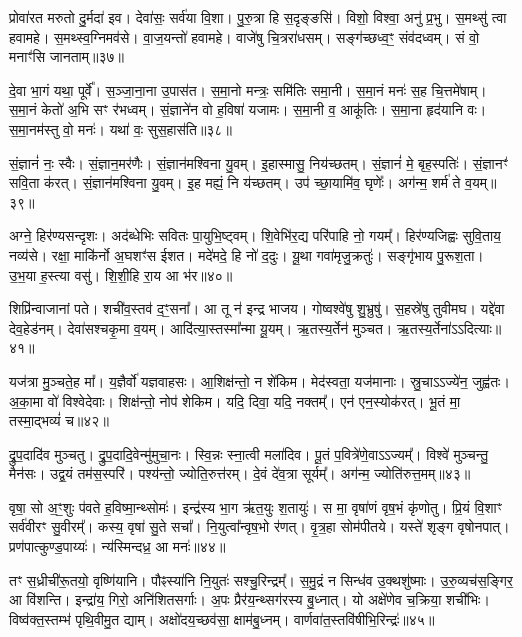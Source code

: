 प्रोवा॑रत मरुतो दु॒र्मदा॑ इव।
देवा॑सः॒ सर्व॑या वि॒शा।
पु॒रु॒त्रा हि स॒दृङ्ङसि॑।
विशो॒ विश्वा॒ अनु॑ प्र॒भु।
स॒मथ्सु॑ त्वा हवामहे।
स॒मथ्स्व॒ग्निमव॑से।
वा॒ज॒यन्तो॑ हवामहे।
वाजे॑षु चि॒त्ररा॑धसम्।
सङ्ग॑च्छध्व॒ꣳ॒ संव॑दध्वम्।
सं वो॒ मनाꣳ॑सि जानताम्॥३७॥\ip

दे॒वा भा॒गं यथा॒ पूर्वे᳚।
स॒ञ्जा॒ना॒ना उ॒पास॑त।
स॒मा॒नो मन्त्रः॒ समि॑तिः समा॒नी।
स॒मा॒नं मनः॑ स॒ह चि॒त्तमे॑षाम्।
स॒मा॒नं केतो॑ अ॒भि सꣳ र॑भध्वम्।
सं॒ज्ञाने॑न वो ह॒विषा॑ यजामः।
स॒मा॒नी व॒ आकू॑तिः।
स॒मा॒ना हृद॑यानि वः।
स॒मा॒नम॑स्तु वो॒ मनः॑।
यथा॑ वः॒ सुस॒हास॑ति॥३८॥\ip

सं॒ज्ञानं॑ नः॒ स्वैः।
सं॒ज्ञान॒मर॑णैः।
सं॒ज्ञान॑मश्विना यु॒वम्।
इ॒हास्मासु॒ निय॑च्छतम्।
सं॒ज्ञानं॑ मे॒ बृह॒स्पतिः॑।
सं॒ज्ञानꣳ॑ सवि॒ता क॑रत्।
सं॒ज्ञान॑मश्विना यु॒वम्।
इ॒ह मह्यं॒ नि य॑च्छतम्।
उप॑ च्छा॒यामि॑व॒ घृणेः᳚।
अग॑न्म॒ शर्म॑ ते व॒यम्॥३९॥\ip

अग्ने॒ हिर॑ण्यसन्दृशः।
अद॑ब्धेभिः सवितः पा॒युभि॒ष्ट्वम्।
शि॒वेभि॑र॒द्य परि॑पाहि नो॒ गयम्᳚।
हिर॑ण्यजिह्वः सुवि॒ताय॒ नव्य॑से।
रक्षा॒ माकि॑र्नो अ॒घशꣳ॑स ईशत।
मदे॑मदे॒ हि नो॑ द॒दुः।
यू॒था गवा॑मृजु॒क्रतुः॑।
सङ्गृ॑भाय पु॒रूश॒ता।
उ॒भ॒या ह॒स्त्या वसु॑।
शि॒शी॒हि रा॒य आ भ॑र॥४०॥\ip

शिप्रि॑न्वाजानां पते।
शची॑व॒स्तव॑ द॒ꣳ॒सना᳚।
आ तू न॑ इन्द्र भाजय।
गोष्वश्वे॑षु शु॒भ्रुषु॑।
स॒हस्रे॑षु तुवीमघ।
यद्दे॑वा देव॒हेड॑नम्।
देवा॑सश्चकृ॒मा व॒यम्।
आदि॑त्या॒स्तस्मा᳚न्मा यू॒यम्।
ऋ॒तस्य॒र्तेन॑ मुञ्चत।
ऋ॒तस्य॒र्तेना॑ऽऽदित्याः॥४१॥\ip

यज॑त्रा मु॒ञ्चते॒ह मा᳚।
य॒ज्ञैर्वो॑ यज्ञवाहसः।
आ॒शिक्ष॑न्तो॒ न शे॑किम।
मेद॑स्वता॒ यज॑मानाः।
स्रु॒चा\-ऽऽज्ये॑न॒ जुह्व॑तः।
अ॒का॒मा वो॑ विश्वेदेवाः।
शिक्ष॑न्तो॒ नोप॑ शेकिम।
यदि॒ दिवा॒ यदि॒ नक्तम्᳚।
एन॑ एन॒स्योक॑रत्।
भू॒तं मा॒ तस्मा॒द्भव्यं॑ च॥४२॥\ip

द्रु॒प॒दादि॑व मुञ्चतु।
द्रु॒प॒दादि॒वेन्मु॑मुचा॒नः।
स्वि॒न्नः स्ना॒त्वी मला॑दिव।
पू॒तं प॒वित्रे॑णे॒वाऽऽज्यम्᳚।
विश्वे॑ मुञ्चन्तु॒ मैन॑सः।
उद्व॒यं तम॑स॒स्परि॑।
पश्य॑न्तो॒ ज्योति॒रुत्त॑रम्।
दे॒वं दे॑व॒त्रा सूर्यम्᳚।
अग॑न्म॒ ज्योति॑रुत्त॒मम्॥४३॥\ip\anuvakamend[तव॑ कृधि॒ वन॒स्पती᳚ञ्जानता॒मस॑ति व॒यं भ॑रादित्याश्च॒ नव॑ च]

वृषा॒ सो अ॒ꣳ॒शुः प॑वते ह॒विष्मा॒न्थ्सोमः॑।
इन्द्र॑स्य भा॒ग ऋ॑त॒युः श॒तायुः॑।
स मा॒ वृषा॑णं वृष॒भं कृ॑णोतु।
प्रि॒यं वि॒शाꣳ सर्व॑वीरꣳ सु॒वीरम्᳚।
कस्य॒ वृषा॑ सु॒ते सचा᳚।
नि॒युत्वा᳚न्वृष॒भो र॑णत्।
वृ॒त्र॒हा सोम॑पीतये।
यस्ते॑ शृङ्ग वृषोनपात्।
प्रण॑पात्कुण्ड॒पाय्यः॑।
न्य॑स्मिन्दध्र॒ आ मनः॑॥४४॥\ip

तꣳ स॒ध्रीची॑रू॒तयो॒ वृष्णि॑यानि।
पौꣴस्या॑नि नि॒युतः॑ सश्चु॒\-रिन्द्रम्᳚।
स॒मु॒द्रं न सिन्ध॑व उ॒क्थशु॑ष्माः।
उ॒रु॒व्यच॑स॒ङ्गिर॒ आ वि॑शन्ति।
इन्द्रा॑य॒ गिरो॒ अनि॑शितसर्गाः।
अ॒पः प्रैर॑य॒न्थ्सग॑रस्य बु॒ध्नात्।
यो अक्षे॑णेव च॒क्रिया॒ शची॑भिः।
विष्व॑क्त॒स्तम्भ॑ पृथि॒वीमु॒त द्याम्।
अक्षो॑दय॒च्छव॑सा॒ क्षाम॑बु॒ध्नम्।
वार्णवा॑त॒स्तवि॑षीभि॒रिन्द्रः॑॥४५॥\ip

